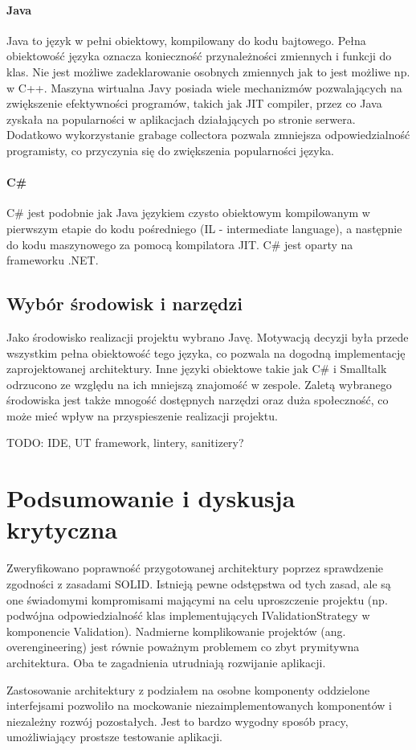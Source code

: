 \documentclass[12pt]{article}
\begin{document}
\paragraph{Java}
Java to język w pełni obiektowy, kompilowany do kodu bajtowego. Pełna obiektowość języka oznacza konieczność przynależności zmiennych i funkcji do klas. Nie jest możliwe zadeklarowanie osobnych zmiennych jak to jest możliwe np. w C++. Maszyna wirtualna Javy posiada wiele mechanizmów pozwalających na zwiększenie efektywności programów, takich jak JIT compiler, przez co Java zyskała na popularności w aplikacjach działających po stronie serwera. Dodatkowo wykorzystanie grabage collectora pozwala zmniejsza odpowiedzialność programisty, co przyczynia się do zwiększenia popularności języka.

\paragraph{C\#}
C\# jest podobnie jak Java językiem czysto obiektowym kompilowanym w pierwszym etapie do kodu pośredniego (IL - intermediate language), a następnie do kodu maszynowego za pomocą kompilatora JIT. C\# jest oparty na frameworku .NET.

\subsection{Wybór środowisk i narzędzi}
Jako środowisko realizacji projektu wybrano Javę. Motywacją decyzji była przede wszystkim pełna obiektowość tego języka, co pozwala na dogodną implementację zaprojektowanej architektury.
Inne języki obiektowe takie jak C\# i Smalltalk odrzucono ze względu na ich mniejszą znajomość w zespole.
Zaletą wybranego środowiska jest także mnogość dostępnych narzędzi oraz duża społeczność, co może mieć wpływ na przyspieszenie realizacji projektu.

TODO: IDE, UT framework, lintery, sanitizery?


\section{Podsumowanie i dyskusja krytyczna}

Zweryfikowano poprawność przygotowanej architektury poprzez sprawdzenie zgodności z zasadami SOLID. Istnieją pewne odstępstwa od tych zasad, ale są one świadomymi kompromisami mającymi na celu uproszczenie projektu (np. podwójna odpowiedzialność klas implementujących IValidationStrategy w komponencie Validation). Nadmierne komplikowanie projektów (ang. overengineering) jest równie poważnym problemem co zbyt prymitywna architektura. Oba te zagadnienia utrudniają rozwijanie aplikacji.

Zastosowanie architektury z podziałem na osobne komponenty oddzielone interfejsami pozwoliło na mockowanie niezaimplementowanych komponentów i niezależny rozwój pozostałych. Jest to bardzo wygodny sposób pracy, umożliwiający prostsze testowanie aplikacji.



\newpage
\listoffigures
\end{document}
